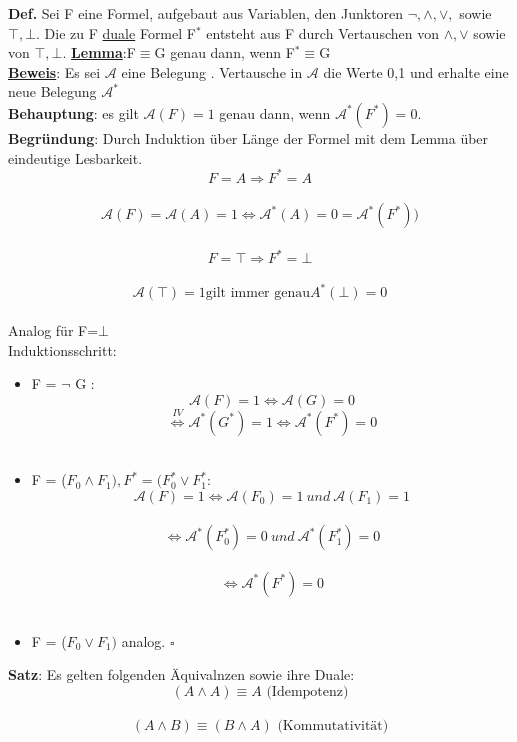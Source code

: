 \documentclass[a4paper]{scrartcl}
\begin{document}
\textbf{Def.} Sei F eine Formel, aufgebaut aus Variablen, den Junktoren $\neg, \land, \lor,$ sowie $\top,\bot$. Die zu F \underline{duale} Formel F$^*$ entsteht aus F durch Vertauschen von $\land, \lor$ sowie von $\top, \bot$.
\textbf{\underline{Lemma}}:F$\equiv$G genau dann, wenn F$^* \equiv$G\\
\textbf{\underline{Beweis}}: Es sei $\mathcal{A}$ eine Belegung . Vertausche in $\mathcal{A}$ die Werte 0,1 und erhalte eine neue Belegung $\mathcal{A}^*$ \\
\textbf{Behauptung}: es gilt $\mathcal{A}(F)=1$ genau dann, wenn $\mathcal{A}^*(F^*)=0$.\\
\textbf{Begründung}: Durch Induktion über Länge der Formel mit dem Lemma über eindeutige Lesbarkeit.\\
$$F = A\Rightarrow F^*=A$$\\
$$ \mathcal{A}(F) = \mathcal{A}(A)=1 \Leftrightarrow \mathcal{A}^*(A)=0=\mathcal{A}^*(F^*))$$\\
$$F=\top \Rightarrow F^*=\bot$$\\
$$\mathcal{A}(\top) = 1\text{gilt immer genau} A^*(\bot)=0$$\\
Analog für F=$\bot$\\
Induktionsschritt:\\
\begin{itemize}
\item F = $\neg$ G : \\
$$ \mathcal{A}(F) = 1 \Leftrightarrow \mathcal{A}(G) = 0$$
$$\overset{IV}{\Leftrightarrow} \mathcal{A}^*(G^*)=1 \Leftrightarrow \mathcal{A}^*(F^*)=0$$\\
\item F = ($F_0 \land F_1) , F^*=(F_0^*\lor F_1^*$:\\
$$\mathcal{A}(F)=1 \Leftrightarrow \mathcal{A}(F_0)=1 ~und~\mathcal{A}(F_1)=1$$\\
$$\Leftrightarrow \mathcal{A}^*(F_0^*)=0 ~und ~\mathcal{A}^*(F_1^*) = 0$$\\
$$\Leftrightarrow \mathcal{A}^*(F^*)=0$$\\
\item F = ($F_0 \lor F_1)$ analog. $\square$\\ 
\end{itemize}
\textbf{Satz}: Es gelten folgenden Äquivalnzen sowie ihre Duale:\\
$$(A\land A ) \equiv A \text{~(Idempotenz)}$$\\
$$(A\land B) \equiv (B \land A) \text{~(Kommutativität)}$$\\
\end{document}
